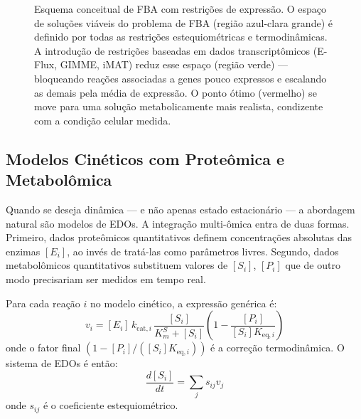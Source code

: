 \begin{figure}[htbp]
\centering
{}
\caption{Esquema conceitual de FBA com restrições de expressão. O espaço de soluções viáveis do problema de FBA (região azul-clara grande) é definido por todas as restrições estequiométricas e termodinâmicas. A introdução de restrições baseadas em dados transcriptômicos (E-Flux, GIMME, iMAT) reduz esse espaço (região verde) --- bloqueando reações associadas a genes pouco expressos e escalando as demais pela média de expressão. O ponto ótimo (vermelho) se move para uma solução metabolicamente mais realista, condizente com a condição celular medida.}
\label{fig:11-fba-restricao}
\end{figure}

\subsection{Modelos Cinéticos com Proteômica e Metabolômica}
\label{sub:image11-cineticos}

Quando se deseja dinâmica --- e não apenas estado estacionário --- a
abordagem natural são modelos de EDOs. A integração multi-ômica entra de
duas formas. Primeiro, dados proteômicos quantitativos definem
concentrações absolutas das enzimas $[E_i]$, ao invés de tratá-las como
parâmetros livres. Segundo, dados metabolômicos quantitativos
substituem valores de $[S_i]$, $[P_i]$ que de outro modo precisariam ser
medidos em tempo real.

Para cada reação $i$ no modelo cinético, a expressão genérica é:
\begin{equation}
v_i = [E_i] \, k_{\mathrm{cat},i} \, \frac{[S_i]}{K_m^S + [S_i]}
                     \left( 1 - \frac{[P_i]}{[S_i] K_{\mathrm{eq},i}} \right)
\end{equation}
onde o fator final $(1 - [P_i]/([S_i] K_{\mathrm{eq},i}))$ é a correção
termodinâmica. O sistema de EDOs é então:
\begin{equation}
\frac{d[S_i]}{dt} = \sum_j s_{ij} v_j
\end{equation}
onde $s_{ij}$ é o coeficiente estequiométrico.

